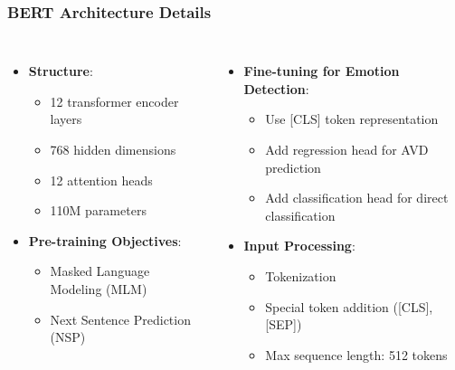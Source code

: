 \documentclass{beamer}
\begin{document}
\begin{frame}
\frametitle{BERT Architecture Details}
\begin{columns}
\begin{itemize}
    \item \textbf{Structure}:
    \begin{itemize}
        \item 12 transformer encoder layers
        \item 768 hidden dimensions
        \item 12 attention heads
        \item 110M parameters
    \end{itemize}
    \item \textbf{Pre-training Objectives}:
    \begin{itemize}
        \item Masked Language Modeling (MLM)
        \item Next Sentence Prediction (NSP)
    \end{itemize}
\end{itemize}

\begin{itemize}
    \item \textbf{Fine-tuning for Emotion Detection}:
    \begin{itemize}
        \item Use [CLS] token representation
        \item Add regression head for AVD prediction
        \item Add classification head for direct classification
    \end{itemize}
    \item \textbf{Input Processing}:
    \begin{itemize}
        \item Tokenization
        \item Special token addition ([CLS], [SEP])
        \item Max sequence length: 512 tokens
    \end{itemize}
\end{itemize}
\end{columns}
\end{frame}
\end{document}
